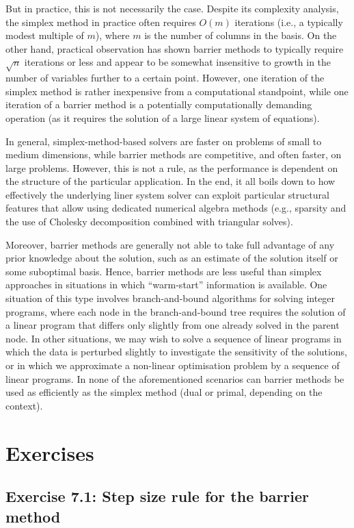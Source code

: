 But in practice, this is not necessarily the case. Despite its complexity analysis, the simplex method in practice often requires $O(m)$ iterations (i.e., a typically modest multiple of $m$), where $m$ is the number of columns in the basis. On the other hand, practical observation has shown barrier methods to typically require $\sqrt{n}$ iterations or less and appear to be somewhat insensitive to growth in the number of variables further to a certain point. However, one iteration of the simplex method is rather inexpensive from a computational standpoint, while one iteration of a barrier method is a potentially computationally demanding operation (as it requires the solution of a large linear system of equations).

In general, simplex-method-based solvers are faster on problems of small to medium dimensions, while barrier methods are competitive, and often faster, on large problems. However, this is not a rule, as the performance is dependent on the structure of the particular application. In the end, it all boils down to how effectively the underlying liner system solver can exploit particular structural features that allow using dedicated numerical algebra methods (e.g., sparsity and the use of Cholesky decomposition combined with triangular solves).

Moreover, barrier methods are generally not able to take full advantage of any prior knowledge about the solution, such as an estimate of the solution itself or some suboptimal basis. Hence, barrier methods are less useful than simplex approaches in situations in which ``warm-start'' information is available. One situation of this type involves branch-and-bound algorithms for solving integer programs, where each node in the branch-and-bound tree requires the solution of a linear program that differs only slightly from one already solved in the parent node. In other situations, we may wish to solve a sequence of linear programs in which the data is perturbed slightly to investigate the sensitivity of the solutions, or in which we approximate a non-linear optimisation problem by a sequence of linear programs. In none of the aforementioned scenarios can barrier methods be used as efficiently as the simplex method (dual or primal, depending on the context).

\vfill
\pagebreak	

\section{Exercises}


\subsection*{Exercise 7.1: Step size rule for the barrier method}



